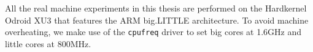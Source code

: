 All the real machine experiments in this thesis are performed on the Hardkernel Odroid XU3 that features the ARM big.LITTLE architecture. 
To avoid machine overheating, we make use of the \texttt{cpufreq} driver to set big cores at 1.6GHz and little cores at 800MHz. 






